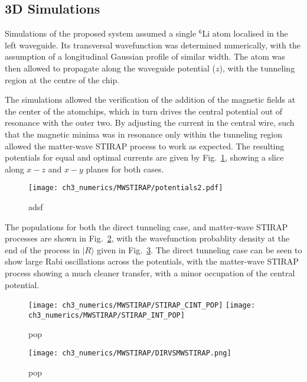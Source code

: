 \subsection{3D Simulations}
\label{sec:Results}

Simulations of the proposed system assumed a single $^{6}$Li atom localised in the left waveguide. Its transversal wavefunction was determined numerically, with the assumption of a longitudinal Gaussian profile of similar width. The atom was then allowed to propagate along the waveguide potential ($z$), with the tunneling region at the centre of the chip.

The simulations allowed the verification of the addition of the magnetic fields at the center of the atomchips, which in turn drives the central potential out of resonance with the outer two. By adjusting the current in the central wire, such that the magnetic minima was in resonance only within the tunneling region allowed the matter-wave STIRAP process to work as expected. The resulting potentials for equal and optimal currents are given by Fig.~\ref{fig:equaloptcurrent}, showing a slice along $x-z$ and $x-y$ planes for both cases.

\begin{figure}[tb]
    \centering
  \texttt{[image: ch3\_numerics/MWSTIRAP/potentials2.pdf]}
  \caption{adsf}
  \label{fig:equaloptcurrent}
\end{figure}

The populations for both the direct tunneling case, and matter-wave STIRAP processes are shown in Fig.~\ref{fig:mwsVsDT}, with the wavefunction probablity density at the end of the process in $|R\rangle$ given in Fig.~\ref{fig:DIRVSMWSTIRAP}. The direct tunneling case can be seen to show large Rabi oscillations across the potentials, with the matter-wave STIRAP process showing a much cleaner transfer, with a minor occupation of the central potential.

\begin{figure}[tb]
    \centering
  \texttt{[image: ch3\_numerics/MWSTIRAP/STIRAP\_CINT\_POP]}
  \texttt{[image: ch3\_numerics/MWSTIRAP/STIRAP\_INT\_POP]}
  \caption{pop}
  \label{fig:mwsVsDT}
\end{figure}

\begin{figure}[tb]
    \centering
  \texttt{[image: ch3\_numerics/MWSTIRAP/DIRVSMWSTIRAP.png]}
  \caption{pop}
  \label{fig:DIRVSMWSTIRAP}
\end{figure}

